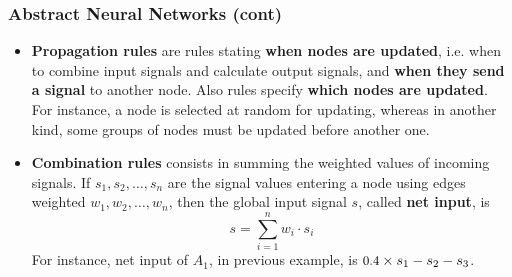 %
\begin{frame}
\frametitle{Abstract Neural Networks (cont)}

\begin{itemize}

  \item \textbf{Propagation rules} are rules stating \textbf{when
    nodes are updated}, i.e. when to combine input signals and
  calculate output signals, and \textbf{when they send a signal} to
  another node. Also rules specify \textbf{which nodes are
    updated}. For instance, a node is selected at random for updating,
  whereas in another kind, some groups of nodes must be updated before
  another one.

  \item \textbf{Combination rules} consists in summing the
  weighted values of incoming signals. If $s_1, s_2, \dots, s_n$ are
  the signal values entering a node using edges weighted $w_1, w_2,
  \dots, w_n$, then the global input signal $s$, called \textbf{net
  input}, is \[s = \sum_{i=1}^{n}{w_i \cdot s_i}\] For
  instance, net input of $A_1$, in previous example, is \(\text{\small
  0.4} \times s_1 - s_2 - s_3\).

\end{itemize}

\end{frame}


